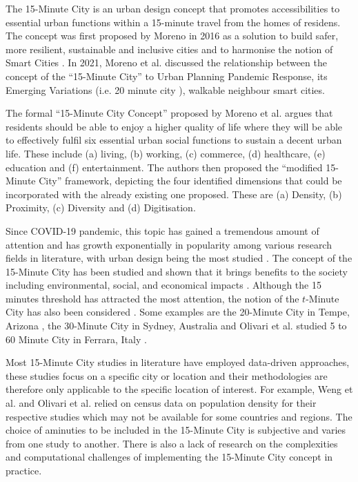 The 15-Minute City is an urban design concept that promotes accessibilities to essential urban functions within a 15-minute travel from the homes of residens. The concept was first proposed by Moreno in 2016 as a solution to build safer, more resilient, sustainable and inclusive cities and to harmonise the notion of Smart Cities \cite{moreno_introducing_2021}. In 2021, Moreno et al. discussed the relationship between the concept of the “15-Minute City” to Urban Planning Pandemic Response, its Emerging Variations (i.e. 20 minute city \cite{capasso_da_silva_accessibility_2019}), walkable neighbour \cite{weng_15-minute_2019} smart cities.

The formal “15-Minute City Concept” proposed by Moreno et al. argues that residents should be able to enjoy a higher quality of life where they will be able to effectively fulfil six essential urban social functions to sustain a decent urban life. These include (a) living, (b) working, (c) commerce, (d) healthcare, (e) education and (f) entertainment. The authors then proposed the “modified 15-Minute City” framework, depicting the four identified dimensions that could be incorporated with the already existing one proposed. These are (a) Density, (b) Proximity, (c) Diversity and (d) Digitisation.

Since COVID-19 pandemic, this topic has gained a tremendous amount of attention and has growth exponentially in popularity \cite{lima_quest_2023,allam_theoretical_2022} among various research fields in literature, with urban design being the most studied \cite{lima_quest_2023}. The concept of the 15-Minute City has been studied and shown that it brings benefits to the society including environmental, social, and economical impacts \cite{allam_theoretical_2022}. Although the 15 minutes threshold has attracted the most attention, the notion of the $t$-Minute City has also been considered \cite{moreno_introducing_2021}. Some examples are the 20-Minute City in Tempe, Arizona \cite{capasso_da_silva_accessibility_2019}, the 30-Minute City in Sydney, Australia \cite{sarkar_measuring_2020} and Olivari et al. studied 5 to 60 Minute City in Ferrara, Italy \cite{olivari_are_2023}. 

Most 15-Minute City studies in literature have employed data-driven approaches, these studies focus on a specific city or location and their methodologies are therefore only applicable to the specific location of interest. For example, Weng et al. \cite{weng_15-minute_2019} and Olivari et al.\cite{olivari_are_2023} relied on census data on population density for their respective studies which may not be available for some countries and regions. The choice of aminuties to be included in the 15-Minute City is subjective and varies from one study to another. There is also a lack of research on the complexities and computational challenges of implementing the 15-Minute City concept in practice.

